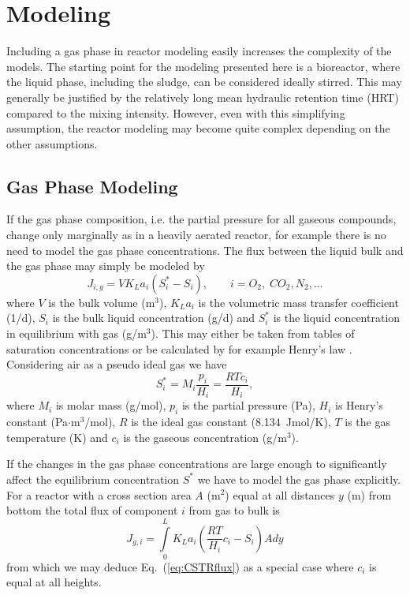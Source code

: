 \chapter{Modeling}\label{chap:modeling}
Including a gas phase in reactor modeling easily increases the complexity of the models. The starting point for the modeling presented here is a bioreactor, where the liquid phase, including the sludge, can be considered ideally stirred. This may generally be justified by the relatively long mean hydraulic retention time (HRT) compared to the mixing intensity. However, even with this simplifying assumption, the reactor modeling may become quite complex depending on the other assumptions.

\section{Gas Phase Modeling}
If the gas phase composition, i.e. the partial pressure for all gaseous compounds, change only marginally as in a heavily aerated reactor, for example there is no need to model the gas phase concentrations. The flux between the liquid bulk and the gas phase may simply be modeled by
\begin{equation}\label{eq:CSTRflux}
J_{i,g}=VK_La_i(S_i^\ast-S_i),\qquad i=O_2,\;CO_2,N_2,\ldots
\end{equation}
where $V$ is the bulk volume (m$^3$), $K_La_i$ is the volumetric mass transfer coefficient (1/d), $S_i$ is the bulk liquid concentration (g/d) and $S_i^\ast$ is the liquid concentration in equilibrium with gas (g/m$^3$). This may either be taken from tables of saturation concentrations or be calculated by for example Henry's law \cite{CR:CE:78}. Considering air as a pseudo ideal gas we have
\begin{equation}\label{eq:henry}
S_i^\ast=M_i\frac{p_i}{H_i}=\frac{RTc_i}{H_i},
\end{equation}
where $M_i$ is molar mass (g/mol), $p_i$ is the partial pressure (Pa), $H_i$ is Henry's constant (Pa$\cdot$m$^3$/mol), $R$ is the ideal gas constant (8.134~Jmol/K), $T$ is the gas temperature (K) and $c_i$ is the gaseous concentration (g/m$^3$).

If the changes in the gas phase concentrations are large enough to significantly affect the equilibrium concentration $S^\ast$ we have to model the gas phase explicitly. For a reactor with a cross section area $A$ (m$^2$) equal at all distances $y$ (m) from bottom the total flux of component $i$ from gas to bulk is
\begin{equation}\label{eq:A3SSV1Jg}
J_{g,i}=\int\limits_0^LK_La_i\left(\frac{RT}{H_i}c_i-S_i\right)Ady
\end{equation}
from which we may deduce Eq.~(\ref{eq:CSTRflux}) as a special case where $c_i$ is equal at all heights.

